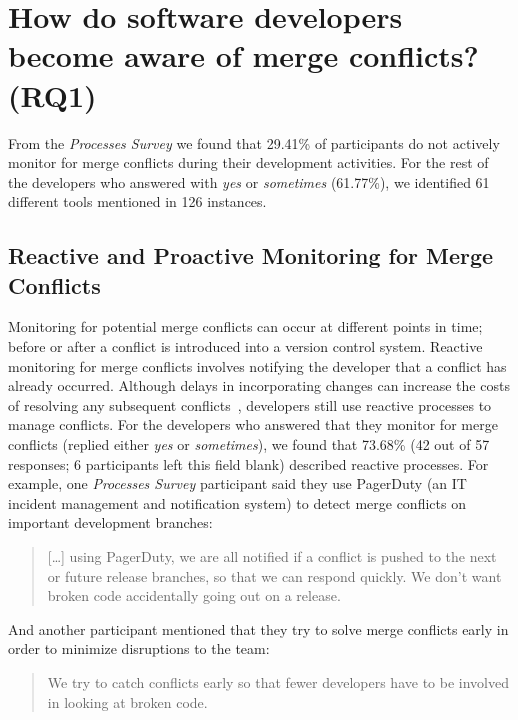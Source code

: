 
\section{How do software developers become \textbf{aware} of merge conflicts? (RQ1)}\label{RQ1}

From the \textit{Processes Survey} we found that 29.41\% of participants do not actively monitor for merge conflicts during their development activities.
For the rest of the developers who answered with \emph{yes} or \emph{sometimes} (61.77\%), we identified 61 different tools mentioned in 126 instances.

\subsection{Reactive and Proactive Monitoring for Merge Conflicts}


Monitoring for potential merge conflicts can occur at different points in time; before or after a conflict is introduced into a version control system.
Reactive monitoring for merge conflicts involves notifying the developer that a conflict has already occurred.
Although delays in incorporating changes can increase the costs of resolving any subsequent conflicts~\cite{deSouza2003breaking,grinter1995using}, developers still use reactive processes to manage conflicts.
For the developers who answered that they monitor for merge conflicts (replied either \emph{yes} or \emph{sometimes}), we found that 73.68\% (42 out of 57 responses; 6 participants left this field blank) described reactive processes.
For example, one \textit{Processes Survey} participant said they use PagerDuty (an IT incident management and notification system) to detect merge conflicts on important development branches:
\begin{quotation}
	[\ldots] using PagerDuty, we are all notified if a conflict is pushed to the next or future release branches, so that we can respond quickly. We don't want broken code accidentally going out on a release.
\end{quotation}
And another participant mentioned that they try to solve merge conflicts early in order to minimize disruptions to the team:
\begin{quotation}
	We try to catch conflicts early so that fewer developers have to be involved in looking at broken code.
\end{quotation}

